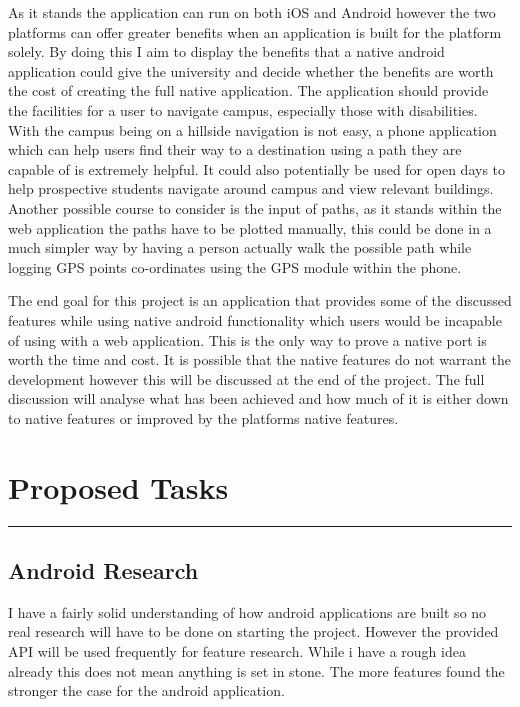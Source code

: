 \documentclass[10pt,a4paper]{article}
\begin{document}
As it stands the application can run on both iOS and Android however the two platforms can offer greater benefits when an application is built for the platform solely. By doing this I aim to display the benefits that a native android application could give the university and decide whether the benefits are worth the cost of creating the full native application. The application should provide the facilities for a user to navigate campus, especially those with disabilities. With the campus being on a hillside navigation is not easy, a phone application which can help users find their way to a destination using a path they are capable of is extremely helpful. It could also potentially be used for open days to help prospective students navigate around campus and view relevant buildings. Another possible course to consider is the input of paths, as it stands within the web application the paths have to be plotted manually, this could be done in a much simpler way by having a person actually walk the possible path while logging GPS points co-ordinates using the GPS module within the phone.  

The end goal for this project is an application that provides some of the discussed features while using native android functionality which users would be incapable of using with a web application. This is the only way to prove a native port is worth the time and cost.  It is possible that the native features do not warrant the development however this will be discussed at the end of the project. The full discussion will analyse what has been achieved and how much of it is either down to native features or improved by the platforms native features. 

\vspace{0.4cm}
\section{Proposed Tasks}
\vspace{0.2cm}
\hrule
\vspace{0.4cm}

\subsection{Android Research}

I have a fairly solid understanding of how android applications are built so no real research will have to be done on starting the project. However the provided API will be used frequently for feature research. While i have a rough idea already this does not mean anything is set in stone. The more features found the stronger the case for the android application.
\end{document}
